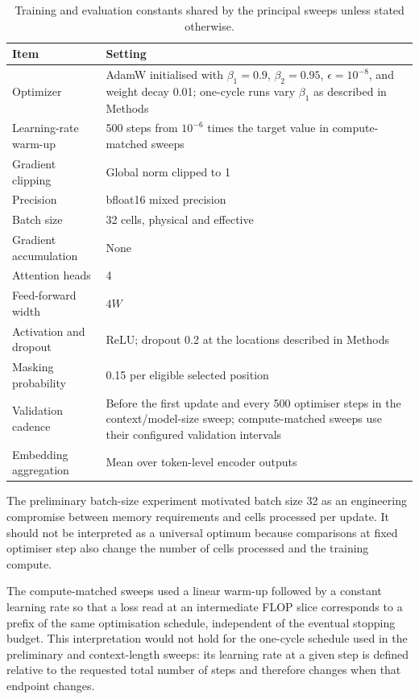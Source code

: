 \documentclass[11pt]{article}
\begin{document}
\begin{table}[ht]
\centering
\caption{Training and evaluation constants shared by the principal sweeps unless stated otherwise.}
\label{tab:supp-training-constants}
\small
\begin{tabular}{p{}p{}}
\toprule
Item & Setting \\
\midrule
Optimizer & AdamW initialised with $\beta_1=0.9$, $\beta_2=0.95$, $\epsilon=10^{-8}$, and weight decay 0.01; one-cycle runs vary $\beta_1$ as described in Methods \\
Learning-rate warm-up & 500 steps from $10^{-6}$ times the target value in compute-matched sweeps \\
Gradient clipping & Global norm clipped to 1 \\
Precision & bfloat16 mixed precision \\
Batch size & 32 cells, physical and effective \\
Gradient accumulation & None \\
Attention heads & 4 \\
Feed-forward width & $4W$ \\
Activation and dropout & ReLU; dropout 0.2 at the locations described in Methods \\
Masking probability & 0.15 per eligible selected position \\
Validation cadence & Before the first update and every 500 optimiser steps in the context/model-size sweep; compute-matched sweeps use their configured validation intervals \\
Embedding aggregation & Mean over token-level encoder outputs \\
\bottomrule
\end{tabular}
\end{table}

The preliminary batch-size experiment motivated batch size 32 as an engineering compromise between memory requirements and cells processed per update.
It should not be interpreted as a universal optimum because comparisons at fixed optimiser step also change the number of cells processed and the training compute.

The compute-matched sweeps used a linear warm-up followed by a constant learning rate so that a loss read at an intermediate FLOP slice corresponds to a prefix of the same optimisation schedule, independent of the eventual stopping budget.
This interpretation would not hold for the one-cycle schedule used in the preliminary and context-length sweeps: its learning rate at a given step is defined relative to the requested total number of steps and therefore changes when that endpoint changes.
\end{document}
